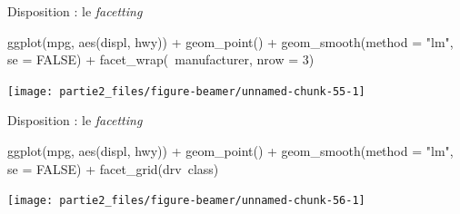 \documentclass[12pt,ignorenonframetext,]{beamer}
\newenvironment{Shaded}{}{}
\newcommand{\KeywordTok}[1]{\textcolor[rgb]{0.00,0.00,1.00}{#1}}
\newcommand{\DataTypeTok}[1]{#1}
\newcommand{\DecValTok}[1]{#1}
\newcommand{\StringTok}[1]{\textcolor[rgb]{0.00,0.50,0.50}{#1}}
\newcommand{\OtherTok}[1]{\textcolor[rgb]{1.00,0.25,0.00}{#1}}
\newcommand{\OperatorTok}[1]{#1}
\newcommand{\NormalTok}[1]{#1}
\renewenvironment{Shaded}{\begin{snugshade}}{\end{snugshade}}
\begin{document}
\begin{frame}[fragile]{Disposition : le \emph{facetting}}

\footnotesize \center

\begin{Shaded}
\begin{Highlighting}[]
\KeywordTok{ggplot}\NormalTok{(mpg, }\KeywordTok{aes}\NormalTok{(displ, hwy)) }\OperatorTok{+}
\StringTok{  }\KeywordTok{geom_point}\NormalTok{() }\OperatorTok{+}\StringTok{ }\KeywordTok{geom_smooth}\NormalTok{(}\DataTypeTok{method =} \StringTok{"lm"}\NormalTok{, }\DataTypeTok{se =} \OtherTok{FALSE}\NormalTok{) }\OperatorTok{+}\StringTok{ }
\StringTok{  }\KeywordTok{facet_wrap}\NormalTok{(}\OperatorTok{~}\NormalTok{manufacturer, }\DataTypeTok{nrow =} \DecValTok{3}\NormalTok{)}
\end{Highlighting}
\end{Shaded}

\texttt{[image: partie2\_files/figure-beamer/unnamed-chunk-55-1]}

\end{frame}

\begin{frame}[fragile]{Disposition : le \emph{facetting}}

\footnotesize \center

\begin{Shaded}
\begin{Highlighting}[]
\KeywordTok{ggplot}\NormalTok{(mpg, }\KeywordTok{aes}\NormalTok{(displ, hwy)) }\OperatorTok{+}
\StringTok{  }\KeywordTok{geom_point}\NormalTok{() }\OperatorTok{+}\StringTok{ }\KeywordTok{geom_smooth}\NormalTok{(}\DataTypeTok{method =} \StringTok{"lm"}\NormalTok{, }\DataTypeTok{se =} \OtherTok{FALSE}\NormalTok{) }\OperatorTok{+}\StringTok{ }
\StringTok{  }\KeywordTok{facet_grid}\NormalTok{(drv}\OperatorTok{~}\NormalTok{class)}
\end{Highlighting}
\end{Shaded}

\texttt{[image: partie2\_files/figure-beamer/unnamed-chunk-56-1]}

\end{frame}
\end{document}

